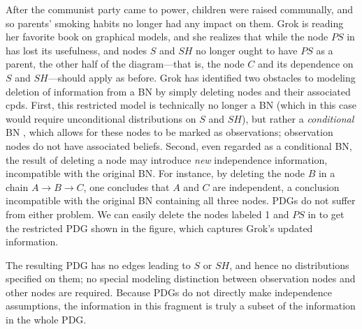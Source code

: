 \documentclass{article}
\theoremstyle{plain}
\theoremstyle{definition}
\theoremstyle{remark}
\numberwithin{equation}{section}
\begin{document}
\begin{example}[restriction]\label{ex:grok-ablate}
After the communist party came to power,
children were raised communally, and so parents' smoking habits no longer had any impact on them. Grok is reading her favorite book on graphical models, and she realizes that while the node $\mathit{PS}$ in  has lost its usefulness, and nodes $S$ and $\mathit{SH}$ no longer ought to have $\mathit{PS}$ as a parent, the other half of the diagram---that is, the node $C$ and its dependence on $S$ and $\mathit{SH}$---should apply as before.
Grok has identified two obstacles to modeling deletion of information from a BN
by simply deleting nodes and their associated cpds. First, this restricted model
is technically no longer a BN (which in this case would require unconditional
distributions on $S$ and $\mathit{SH}$), but rather a \emph{conditional} BN
\cite{KF09}, which allows for these nodes to be marked as observations;
observation nodes do not have associated beliefs. Second, even regarded as a
conditional BN, the result of deleting a node may introduce \emph{new}
independence information, incompatible with the original BN. For instance, by
deleting the node $B$ in a chain $A \rightarrow B \rightarrow C$, one concludes
that $A$ and $C$ are independent, a conclusion incompatible with the original BN
containing all three nodes.   
PDGs do not suffer from either problem.  We can easily delete the
nodes labeled 1 and $PS$ in  to get the
restricted PDG shown in the figure, which captures Grok's updated information.
\begin{vfull}
The resulting PDG has no edges leading to $S$ or $\mathit{SH}$, and hence no
distributions specified on them; no special modeling distinction between
observation nodes and other nodes are required. Because PDGs do not directly
make independence assumptions, the information in this fragment is truly a
subset of the information in the whole PDG. 	
\end{vfull}
% 
\end{example}
\end{document}
